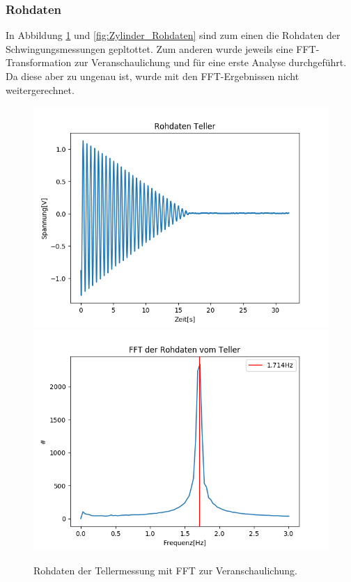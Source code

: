 \documentclass[12pt,a4paper]{article}
\begin{document}
\subsubsection{Rohdaten}
In Abbildung \ref{fig:Teller_Rohdaten} und \ref{fig:Zylinder_Rohdaten} sind zum einen die Rohdaten der Schwingungsmessungen gepltottet. Zum anderen wurde jeweils eine FFT-Transformation zur Veranschaulichung und für eine erste Analyse durchgeführt. Da diese aber zu ungenau ist, wurde mit den FFT-Ergebnissen nicht weitergerechnet.
\begin{figure}
\includegraphics[width=0.49\linewidth]{Bilder/Teller_Rohdaten.PNG}
\includegraphics[width=0.49\linewidth]{Bilder/Teller_FFT.PNG}
\caption{Rohdaten der Tellermessung mit FFT zur Veranschaulichung.}
\label{fig:Teller_Rohdaten}
\end{figure}
\end{document}
